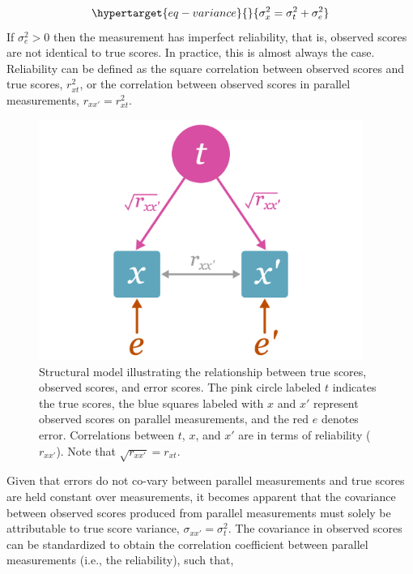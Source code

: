 \documentclass[
  letterpaper,
  DIV=11,
  numbers=noendperiod]{scrreprt}
\begin{document}
\begin{equation}\protect\hypertarget{eq-variance}{}{
\sigma_{x}^2 = \sigma_t^2 + \sigma_{e}^2
}\label{eq-variance}\end{equation} If \(\sigma_{e}^2 > 0\) then the
measurement has imperfect reliability, that is, observed scores are not
identical to true scores. In practice, this is almost always the case.
Reliability can be defined as the square correlation between observed
scores and true scores, \(r_{xt}^2\), or the correlation between
observed scores in parallel measurements, \(r_{xx'}=r_{xt}^2\).

\begin{figure}

{\centering \includegraphics[width=4.16667in,height=\textheight]{figure/unreliability_diagram_1.png}

}

\caption{Structural model illustrating the relationship between true
scores, observed scores, and error scores. The pink circle labeled \(t\)
indicates the true scores, the blue squares labeled with \(x\) and
\(x'\) represent observed scores on parallel measurements, and the red
\(e\) denotes error. Correlations between \(t\), \(x\), and \(x'\) are
in terms of reliability (\(r_{xx'}\)). Note that
\(\sqrt{r_{xx'}}=r_{xt}\).}

\end{figure}

Given that errors do not co-vary between parallel measurements and true
scores are held constant over measurements, it becomes apparent that the
covariance between observed scores produced from parallel measurements
must solely be attributable to true score variance,
\(\sigma_{xx'}=\sigma_t^2\). The covariance in observed scores can be
standardized to obtain the correlation coefficient between parallel
measurements (i.e., the reliability), such that,
\end{document}
